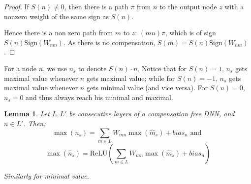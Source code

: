 \documentclass[]{article}
\newtheorem{lemma}{Lemma}
\theoremstyle{definition}
\newcommand{\ReLU}{\mathrm{ReLU}}
\begin{document}
\begin{proof}
	If $S(n) \neq 0$, then there is a path $\pi$ from $n$ to the output node $z$ with a nonzero weight of the same sign as $S(n)$. 
	
	Hence there is a non zero path from $m$ to $z$: $(m n) \pi$, which is of sign 
	$S(n)\mathrm{Sign}(W_{n m})$. As there is no compensation, $S(m)=S(n)\mathrm{Sign}(W_{n m})$.
\end{proof}


For a node $n$, we use $n_s$ to denote $S(n)\cdot n$. 
Notice that for $S(n)=1$, $n_s$ gets maximal value whenever $n$ gets maximal value; 
while for $S(n)=-1$, $n_s$ gets maximal value whenever $n$ gets minimal value (and vice versa). For $S(n)=0$, $n_s=0$ and thus always reach his minimal and maximal.



\begin{lemma}
	\label{lemma2}
	Let $L,L'$ be consecutive layers of a compensation free DNN, and $n \in L'$. 
	Then:
		$$ \max(n_s)=\sum_{m \in L}W_{m n} \max(\hat{m}_s)+bias_n \text{ and }$$
		$$\max(\hat{n}_s)=\ReLU(\sum_{m \in L}W_{m n} \max(\hat{m}_s)+bias_n)$$
		
	
	
	Similarly for minimal value.
	
\end{lemma}
\end{document}
